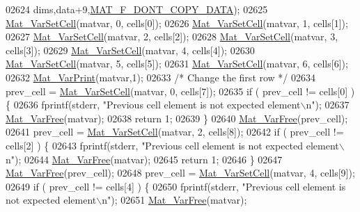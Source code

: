 \begin{DoxyCode}
{{{{{{{{02624                              dims,data+9,\hyperlink{group___m_a_t_ggab9d6ef9e3ddca78a317b173f01d53fbba762244499f52eb35e7b53fb79a1f2889}{MAT\_F\_DONT\_COPY\_DATA});
02625     \hyperlink{group___m_a_t_ga1b2c36f27ba592206c22c584a30a3c5c}{Mat\_VarSetCell}(matvar, 0, cells[0]);
02626     \hyperlink{group___m_a_t_ga1b2c36f27ba592206c22c584a30a3c5c}{Mat\_VarSetCell}(matvar, 1, cells[1]);
02627     \hyperlink{group___m_a_t_ga1b2c36f27ba592206c22c584a30a3c5c}{Mat\_VarSetCell}(matvar, 2, cells[2]);
02628     \hyperlink{group___m_a_t_ga1b2c36f27ba592206c22c584a30a3c5c}{Mat\_VarSetCell}(matvar, 3, cells[3]);
02629     \hyperlink{group___m_a_t_ga1b2c36f27ba592206c22c584a30a3c5c}{Mat\_VarSetCell}(matvar, 4, cells[4]);
02630     \hyperlink{group___m_a_t_ga1b2c36f27ba592206c22c584a30a3c5c}{Mat\_VarSetCell}(matvar, 5, cells[5]);
02631     \hyperlink{group___m_a_t_ga1b2c36f27ba592206c22c584a30a3c5c}{Mat\_VarSetCell}(matvar, 6, cells[6]);
02632     \hyperlink{group___m_a_t_ga9100c145e338b84b55d5d0795d5d390a}{Mat\_VarPrint}(matvar,1);
02633     \textcolor{comment}{/* Change the first row */}
02634     prev\_cell = \hyperlink{group___m_a_t_ga1b2c36f27ba592206c22c584a30a3c5c}{Mat\_VarSetCell}(matvar, 0, cells[7]);
02635     \textcolor{keywordflow}{if} ( prev\_cell != cells[0] ) \{
02636         fprintf(stderr, \textcolor{stringliteral}{"Previous cell element is not expected element\(\backslash\)n"});
02637         \hyperlink{group___m_a_t_ga1d14716f7450530fd1c9d02413787f0e}{Mat\_VarFree}(matvar);
02638         \textcolor{keywordflow}{return} 1;
02639     \}
02640     \hyperlink{group___m_a_t_ga1d14716f7450530fd1c9d02413787f0e}{Mat\_VarFree}(prev\_cell);
02641     prev\_cell = \hyperlink{group___m_a_t_ga1b2c36f27ba592206c22c584a30a3c5c}{Mat\_VarSetCell}(matvar, 2, cells[8]);
02642     \textcolor{keywordflow}{if} ( prev\_cell != cells[2] ) \{
02643         fprintf(stderr, \textcolor{stringliteral}{"Previous cell element is not expected element\(\backslash\)n"});
02644         \hyperlink{group___m_a_t_ga1d14716f7450530fd1c9d02413787f0e}{Mat\_VarFree}(matvar);
02645         \textcolor{keywordflow}{return} 1;
02646     \}
02647     \hyperlink{group___m_a_t_ga1d14716f7450530fd1c9d02413787f0e}{Mat\_VarFree}(prev\_cell);
02648     prev\_cell = \hyperlink{group___m_a_t_ga1b2c36f27ba592206c22c584a30a3c5c}{Mat\_VarSetCell}(matvar, 4, cells[9]);
02649     \textcolor{keywordflow}{if} ( prev\_cell != cells[4] ) \{
02650         fprintf(stderr, \textcolor{stringliteral}{"Previous cell element is not expected element\(\backslash\)n"});
02651         \hyperlink{group___m_a_t_ga1d14716f7450530fd1c9d02413787f0e}{Mat\_VarFree}(matvar);
}}}}}}}}
\end{DoxyCode}
